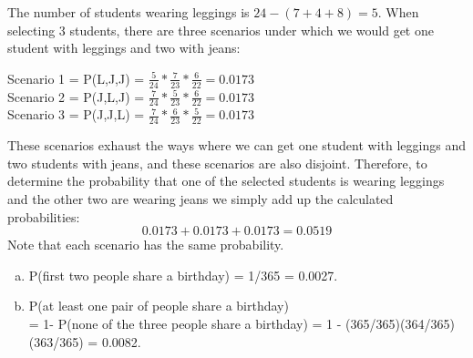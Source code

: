 
{
{
The number of students wearing leggings is $24 - (7+4+8) = 5$. When selecting 3 students, there are three scenarios under which we would get one student with leggings and two with jeans: \\
\begin{center}
Scenario 1 = P(L,J,J) = $\frac{5}{24} * \frac{7}{23} * \frac{6}{22} = 0.0173$ \\
Scenario 2 = P(J,L,J) = $\frac{7}{24} * \frac{5}{23} * \frac{6}{22} = 0.0173$ \\
Scenario 3 = P(J,J,L) = $\frac{7}{24} * \frac{6}{23} * \frac{5}{22} = 0.0173$ \\
\end{center}
These scenarios exhaust the ways where we can get one student with leggings and two students with jeans, and these scenarios are also disjoint. Therefore, to determine the probability that one of the selected students is wearing leggings and the other two are wearing jeans we simply add up the calculated probabilities:
\[ 0.0173 + 0.0173 + 0.0173 = 0.0519 \]
Note that each scenario has the same probability.
}
}


{
{
\begin{enumerate}[(a)]
\setlength{\itemsep}{0mm}
\item P(first two people share a birthday) = 1/365 = 0.0027.
\item P(at least one pair of people share a birthday) \\
= 1- P(none of the three people share a birthday) = 1 - (365/365)(364/365)(363/365) = 0.0082.
\end{enumerate}
}
}


